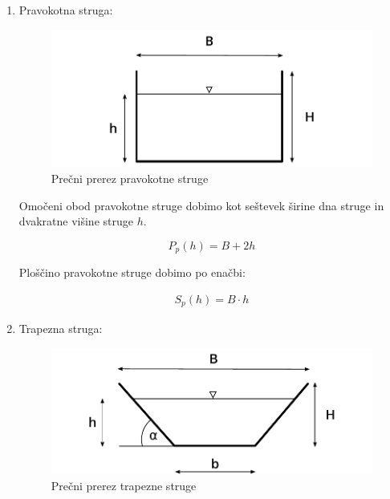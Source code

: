 \begin{enumerate}
	\item Pravokotna struga:
	
	\begin{figure}[ht!]
		\begin{centering}
			\includegraphics{slike/konsumpcijska_krivulja/rectangularChannel.pdf}		
			\caption{Prečni prerez pravokotne struge}\label{fig:pravokotna struga}
		\end{centering}
	\end{figure}
	

	Omočeni obod pravokotne struge dobimo kot seštevek širine dna struge in dvakratne višine struge $h$.
	
	\begin{ceqn}
	\begin{equation}
	P_{p}(h) = B + 2h
	\end{equation}
	\end{ceqn}
	
	Ploščino pravokotne struge dobimo po enačbi:
	
	\begin{ceqn}
	\begin{align}
	S_{p}(h) = B \cdot h
	\end{align}
	\end{ceqn}
	
	\item Trapezna struga:
	
		\begin{figure}[ht!]
			\begin{centering}
				\includegraphics{slike/konsumpcijska_krivulja/trapezoidChannel.pdf}		
				\caption{Prečni prerez trapezne struge}\label{fig:trapezna struga}
			\end{centering}
		\end{figure}
	

\end{enumerate}
